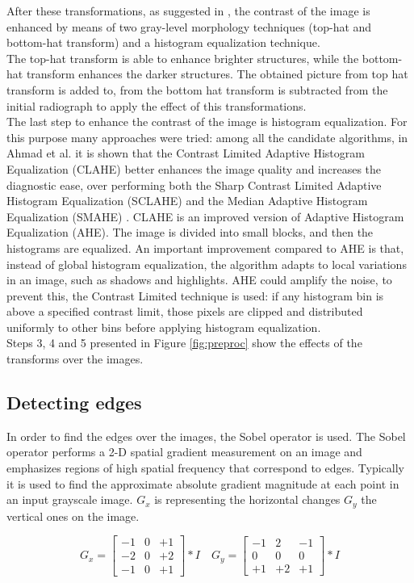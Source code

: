 \documentclass[a4paper]{article}
\begin{document}
After these transformations, as suggested in \cite{huang}, the contrast of the image is enhanced by means of two gray-level morphology techniques (top-hat and bottom-hat transform) and a histogram equalization technique. \\
The top-hat transform is able to enhance brighter structures, while the bottom-hat transform enhances the darker structures. The obtained picture from top hat transform is added to, from the bottom hat transform is subtracted from the initial radiograph to apply the effect of this transformations. \\
The last step to enhance the contrast of the image is histogram equalization. For this purpose many approaches were tried: among all the candidate algorithms, in Ahmad et al. \cite{ahmad} it is shown that the Contrast Limited Adaptive Histogram Equalization (CLAHE) better enhances the image quality and increases the diagnostic ease, over performing both the Sharp Contrast Limited Adaptive Histogram Equalization (SCLAHE) and the Median Adaptive Histogram Equalization (SMAHE) \cite{ahmad}.
CLAHE is an improved version of Adaptive Histogram Equalization (AHE). The image is divided into small blocks, and then the histograms are equalized. An important improvement compared to AHE is that, instead of global histogram equalization, the algorithm adapts to local variations in an image, such as shadows and highlights. AHE could amplify the noise, to prevent this, the Contrast Limited technique is used: if any histogram bin is above a specified contrast limit, those pixels are clipped and distributed uniformly to other bins before applying histogram equalization. \\
Steps 3, 4 and 5 presented in Figure \ref{fig:preproc} show the effects of the transforms over the images. 

\subsection{Detecting edges}
In order to find the edges over the images, the Sobel operator is used. The Sobel operator performs a 2-D spatial gradient measurement on an image and emphasizes regions of high spatial frequency that correspond to edges. Typically it is used to find the approximate absolute gradient magnitude at each point in an input grayscale image. \textit{$G_x$} is representing the horizontal changes \textit{$G_y$} the vertical ones on the image.

\[
  G_x=
  \begin{bmatrix}
    -1 & 0 & +1 \\
    -2 & 0 & +2 \\
    -1 & 0 & +1
  \end{bmatrix} * I\quad
  G_y=
  \begin{bmatrix}
    -1 & 2 & -1 \\
    0 & 0 & 0 \\
    +1 & +2 & +1
  \end{bmatrix} * I
\]
\end{document}
